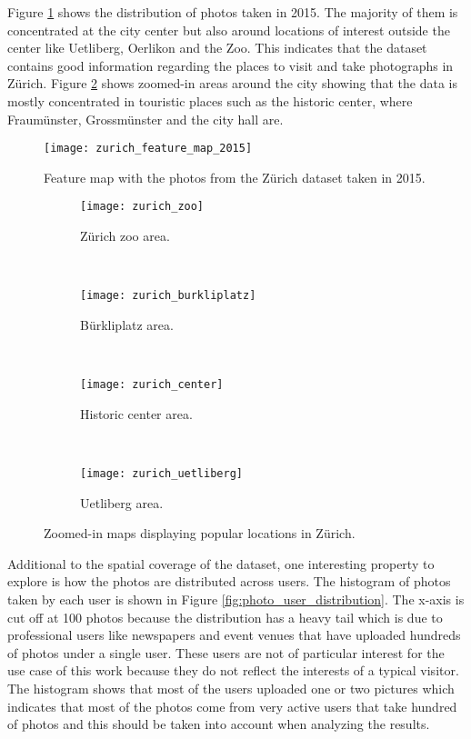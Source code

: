 Figure \ref{fig:heatmap_zurich} shows the distribution of photos taken in 2015. The majority of them is concentrated at the city center but also around locations of interest outside the center like Uetliberg, Oerlikon and the Zoo. This indicates that the dataset contains good information regarding the places to visit and take photographs in Zürich. Figure \ref{fig:heatmap_zurich_zoom} shows zoomed-in areas around the city showing that the data is mostly concentrated in touristic places such as the historic center, where Fraumünster, Grossmünster and the city hall are.

\begin{figure}
  \centering
  \texttt{[image: zurich\_feature\_map\_2015]}
  \caption{Feature map with the photos from the Zürich dataset taken in 2015.}
  \label{fig:heatmap_zurich}
\end{figure}

\begin{figure}
  \centering
  \begin{subfigure}[b]{0.45\textwidth}
    \texttt{[image: zurich\_zoo]}
    \caption{Zürich zoo area.}
  \end{subfigure}
  ~
  \begin{subfigure}[b]{0.45\textwidth}
    \texttt{[image: zurich\_burkliplatz]}
    \caption{Bürkliplatz area.}
  \end{subfigure}
  \hfill \\
  \begin{subfigure}[b]{0.45\textwidth}
    \texttt{[image: zurich\_center]}
    \caption{Historic center area.}
  \end{subfigure}
  ~
  \begin{subfigure}[b]{0.45\textwidth}
    \texttt{[image: zurich\_uetliberg]}
    \caption{Uetliberg area.}
  \end{subfigure}
  \caption{Zoomed-in maps displaying popular locations in Zürich.}
  \label{fig:heatmap_zurich_zoom}
\end{figure}

Additional to the spatial coverage of the dataset, one interesting property to explore is how the photos are distributed across users. The histogram of photos taken by each user is shown in Figure \ref{fig:photo_user_distribution}. The x-axis is cut off at 100 photos because the distribution has a heavy tail which is due to professional users like newspapers and event venues that have uploaded hundreds of photos under a single user. These users are not of particular interest for the use case of this work because they do not reflect the interests of a typical visitor. The histogram shows that most of the users uploaded one or two pictures which indicates that most of the photos come from very active users that take hundred of photos and this should be taken into account when analyzing the results.

